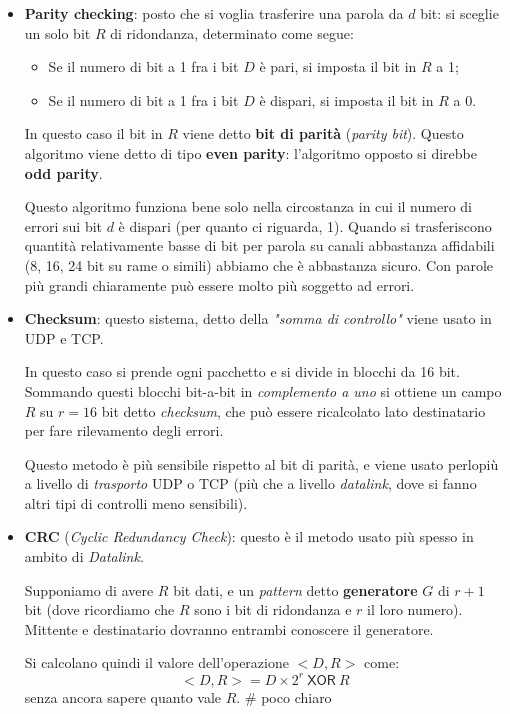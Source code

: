 \documentclass[a4paper,11pt]{article}
\begin{document}
\begin{itemize}
	\item \textbf{Parity checking}: posto che si voglia trasferire una parola da $d$ bit: si sceglie un solo bit $R$ di ridondanza, determinato come segue:
		\begin{itemize}
			\item Se il numero di bit a 1 fra i bit $D$ è pari, si imposta il bit in $R$ a 1;
			\item Se il numero di bit a 1 fra i bit $D$ è dispari, si imposta il bit in $R$ a 0.
		\end{itemize}
		In questo caso il bit in $R$ viene detto \textbf{bit di parità} (\textit{parity bit}). Questo algoritmo viene detto di tipo \textbf{even parity}: l'algoritmo opposto si direbbe \textbf{odd parity}.

		Questo algoritmo funziona bene solo nella circostanza in cui il numero di errori sui bit $d$ è dispari (per quanto ci riguarda, 1). Quando si trasferiscono quantità relativamente basse di bit per parola su canali abbastanza affidabili (8, 16, 24 bit su rame o simili) abbiamo che è abbastanza sicuro. Con parole più grandi chiaramente può essere molto più soggetto ad errori.

	\item \textbf{Checksum}: questo sistema, detto della \textit{"somma di controllo"} viene usato in UDP e TCP. 

		In questo caso si prende ogni pacchetto e si divide in blocchi da 16 bit. Sommando questi blocchi bit-a-bit in \textit{complemento a uno} si ottiene un campo $R$ su $r=16$ bit detto \textit{checksum}, che può essere ricalcolato lato destinatario per fare rilevamento degli errori.

		Questo metodo è più sensibile rispetto al bit di parità, e viene usato perlopiù a livello di \textit{trasporto} UDP o TCP (più che a livello \textit{datalink}, dove si fanno altri tipi di controlli meno sensibili).

	\item \textbf{CRC} (\textit{Cyclic Redundancy Check}): questo è il metodo usato più spesso in ambito di \textit{Datalink}.

		Supponiamo di avere $R$ bit dati, e un \textit{pattern} detto \textbf{generatore} $G$ di $r + 1$ bit (dove ricordiamo che $R$ sono i bit di ridondanza e $r$ il loro numero). Mittente e destinatario dovranno entrambi conoscere il generatore.

		Si calcolano quindi il valore dell'operazione $<D, R>$ come:
		$$
		<D, R> = D \times 2^r \  \mathsf{XOR} \  R
		$$
		senza ancora sapere quanto vale $R$. # poco chiaro


\end{itemize}
\end{document}
